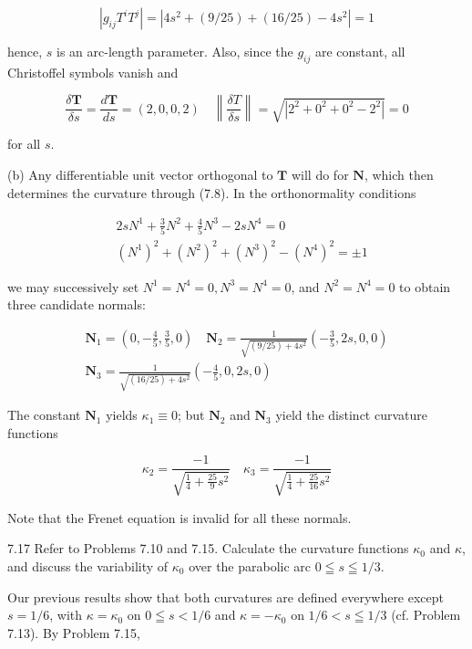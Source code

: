 \documentclass[10pt]{article}
\begin{document}
$$
\left|g_{i j} T^{i} T^{j}\right|=\left|4 s^{2}+(9 / 25)+(16 / 25)-4 s^{2}\right|=1
$$

hence, $s$ is an arc-length parameter. Also, since the $g_{i j}$ are constant, all Christoffel symbols vanish and

$$
\frac{\delta \mathbf{T}}{\delta s}=\frac{d \mathbf{T}}{d s}=(2,0,0,2) \quad\left\|\frac{\delta T}{\delta s}\right\|=\sqrt{\left|2^{2}+0^{2}+0^{2}-2^{2}\right|}=0
$$

for all $s$.

(b) Any differentiable unit vector orthogonal to $\mathbf{T}$ will do for $\mathbf{N}$, which then determines the curvature through (7.8). In the orthonormality conditions

$$
\begin{aligned}
& 2 s N^{1}+\frac{3}{5} N^{2}+\frac{4}{5} N^{3}-2 s N^{4}=0 \\
& \left(N^{1}\right)^{2}+\left(N^{2}\right)^{2}+\left(N^{3}\right)^{2}-\left(N^{4}\right)^{2}= \pm 1
\end{aligned}
$$

we may successively set $N^{1}=N^{4}=0, N^{3}=N^{4}=0$, and $N^{2}=N^{4}=0$ to obtain three candidate normals:

$$
\begin{gathered}
\mathbf{N}_{1}=\left(0,-\frac{4}{5}, \frac{3}{5}, 0\right) \quad \mathbf{N}_{2}=\frac{1}{\sqrt{(9 / 25)+4 s^{2}}}\left(-\frac{3}{5}, 2 s, 0,0\right) \\
\mathbf{N}_{3}=\frac{1}{\sqrt{(16 / 25)+4 s^{2}}}\left(-\frac{4}{5}, 0,2 s, 0\right)
\end{gathered}
$$

The constant $\mathbf{N}_{1}$ yields $\kappa_{1} \equiv 0$; but $\mathbf{N}_{2}$ and $\mathbf{N}_{3}$ yield the distinct curvature functions

$$
\kappa_{2}=\frac{-1}{\sqrt{\frac{1}{4}+\frac{25}{9} s^{2}}} \quad \kappa_{3}=\frac{-1}{\sqrt{\frac{1}{4}+\frac{25}{16} s^{2}}}
$$

Note that the Frenet equation is invalid for all these normals.

7.17 Refer to Problems 7.10 and 7.15. Calculate the curvature functions $\kappa_{0}$ and $\kappa$, and discuss the variability of $\kappa_{0}$ over the parabolic arc $0 \leqq s \leqq 1 / 3$.

Our previous results show that both curvatures are defined everywhere except $s=1 / 6$, with $\kappa=\kappa_{0}$ on $0 \leqq s<1 / 6$ and $\kappa=-\kappa_{0}$ on $1 / 6<s \leqq 1 / 3$ (cf. Problem 7.13). By Problem 7.15,
\end{document}
